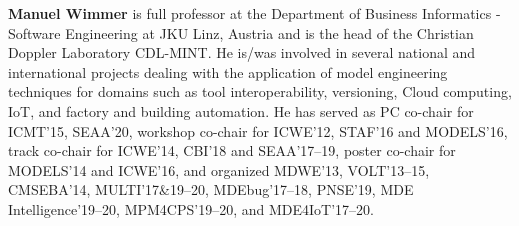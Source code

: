\noindent
\textbf{Manuel Wimmer} is full professor at the Department of Business Informatics - Software Engineering at JKU Linz, Austria and is the head of the Christian Doppler Laboratory CDL-MINT. %
He is/was involved in several national and international projects dealing with the application of model engineering techniques for domains such as tool interoperability, versioning, Cloud computing, IoT, and factory and building automation. 
He has served as PC co-chair for ICMT'15, SEAA'20, workshop co-chair for ICWE'12, STAF'16 and MODELS'16, track co-chair for ICWE'14, CBI'18 and SEAA'17--19, poster co-chair for MODELS'14 and ICWE'16, and organized MDWE'13, VOLT'13--15, CMSEBA'14, MULTI'17\&19--20, MDEbug'17--18, PNSE'19, MDE Intelligence'19--20, MPM4CPS'19--20, and MDE4IoT'17--20.

